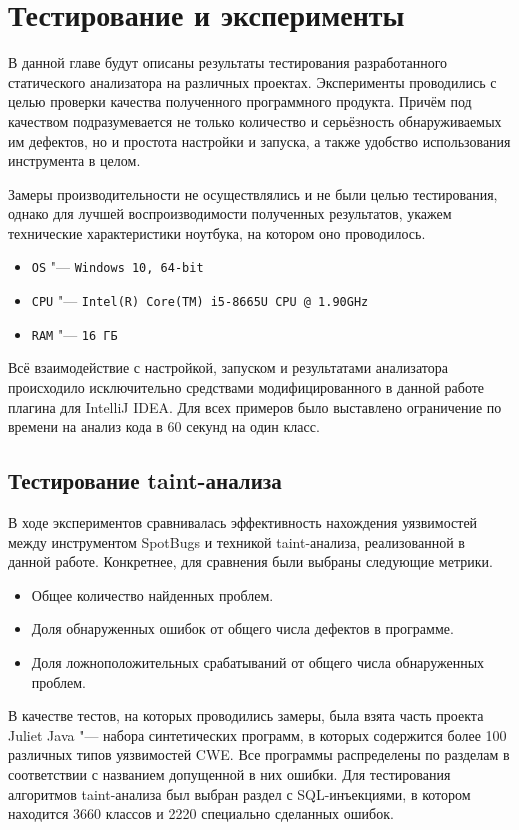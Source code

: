 \section{Тестирование и эксперименты}

В данной главе будут описаны результаты тестирования разработанного статического анализатора на различных проектах. Эксперименты проводились с целью проверки качества полученного программного продукта. Причём под качеством подразумевается не только количество и серьёзность обнаруживаемых им дефектов, но и простота настройки и запуска, а также удобство использования инструмента в целом.

Замеры производительности не осуществлялись и не были целью тестирования, однако для лучшей воспроизводимости полученных результатов, укажем технические характеристики ноутбука, на котором оно проводилось.
\begin{itemize}
    \item \verb|OS| "--- \verb|Windows 10, 64-bit|
    \item \verb|CPU| "--- \verb|Intel(R) Core(TM) i5-8665U CPU @ 1.90GHz|
    \item \verb|RAM| "--- \verb|16 ГБ|
\end{itemize}

Всё взаимодействие с настройкой, запуском и результатами анализатора происходило исключительно средствами модифицированного в данной работе плагина для IntelliJ IDEA. Для всех примеров было выставлено ограничение по времени на анализ кода в 60 секунд на один класс.

\subsection{Тестирование taint-анализа}

В ходе экспериментов сравнивалась эффективность нахождения уязвимостей между инструментом SpotBugs и техникой taint-анализа, реализованной в данной работе. Конкретнее, для сравнения были выбраны следующие метрики.
\begin{itemize}
    \item Общее количество найденных проблем.
    \item Доля обнаруженных ошибок от общего числа дефектов в программе.
    \item Доля ложноположительных срабатываний от общего числа обнаруженных проблем.
\end{itemize}

В качестве тестов, на которых проводились замеры, была взята часть проекта Juliet Java \cite{juliet} "--- набора синтетических программ, в которых содержится более 100 различных типов уязвимостей CWE. Все программы распределены по разделам в соответствии с названием допущенной в них ошибки. Для тестирования алгоритмов taint-анализа был выбран раздел с SQL-инъекциями, в котором находится 3660 классов и 2220 специально сделанных ошибок. 

